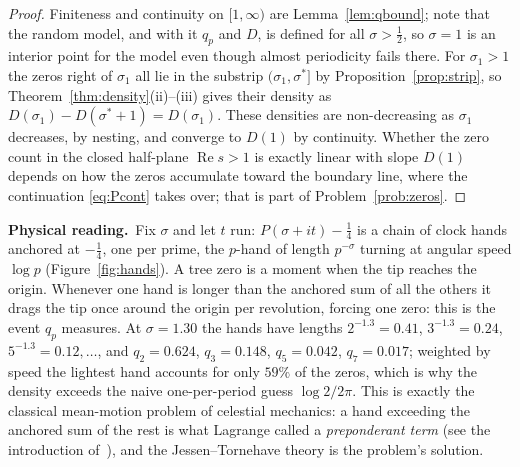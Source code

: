 \documentclass[11pt]{article}
\newcommand{\physread}{\medskip\noindent\textbf{Physical reading.}\ }
\numberwithin{equation}{section}
\theoremstyle{plain}
\theoremstyle{definition}
\theoremstyle{remark}
\begin{document}
\begin{proof}
Finiteness and continuity on $[1, \infty)$ are Lemma~\ref{lem:qbound}; note that the
random model, and with it $q_p$ and $D$, is defined for all $\sigma > \tfrac12$, so
$\sigma = 1$ is an interior point for the model even though almost periodicity fails
there. For $\sigma_1 > 1$ the zeros right of $\sigma_1$ all lie in the substrip
$(\sigma_1, \sigma^{*}]$ by Proposition~\ref{prop:strip}, so
Theorem~\ref{thm:density}(ii)--(iii) gives their density as
$D(\sigma_1) - D(\sigma^{*} + 1) = D(\sigma_1)$. These densities are non-decreasing
as $\sigma_1$ decreases, by nesting, and converge to $D(1)$ by continuity. Whether
the zero count in the closed half-plane $\operatorname{Re} s > 1$ is exactly linear
with slope $D(1)$ depends on how the zeros accumulate toward the boundary line,
where the continuation \eqref{eq:Pcont} takes over; that is part of
Problem~\ref{prob:zeros}.
\end{proof}

\physread Fix $\sigma$ and let $t$ run: $P(\sigma + it) - \tfrac14$ is a chain of
clock hands anchored at $-\tfrac14$, one per prime, the $p$-hand of length
$p^{-\sigma}$ turning at angular speed $\log p$ (Figure~\ref{fig:hands}). A tree zero
is a moment when the tip reaches the origin. Whenever one hand is longer than the
anchored sum of all the others it drags the tip once around the origin per
revolution, forcing one zero: this is the event $q_p$ measures. At $\sigma = 1.30$
the hands have lengths $2^{-1.3} = 0.41$, $3^{-1.3} = 0.24$, $5^{-1.3} = 0.12,
\dots$, and $q_2 = 0.624$, $q_3 = 0.148$, $q_5 = 0.042$, $q_7 = 0.017$; weighted by
speed the lightest hand accounts for only $59\%$ of the zeros, which is why the
density exceeds the naive one-per-period guess $\log 2/2\pi$. This is exactly
the classical mean-motion problem of celestial mechanics: a hand exceeding the
anchored sum of the rest is what Lagrange called a \emph{preponderant term}
(see the introduction of~\cite{jessentornehave}), and the Jessen--Tornehave theory
is the problem's solution.
\end{document}
